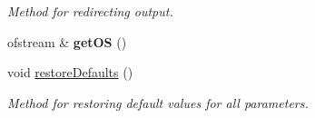 \begin{DoxyCompactItemize}
\begin{DoxyCompactList}\small\item\em Method for redirecting output. \end{DoxyCompactList}\item 
\hypertarget{classSGEnv_ad394d5d5216d7022227f73cd38ec0076}{ofstream \& {\bfseries get\-O\-S} ()}\label{classSGEnv_ad394d5d5216d7022227f73cd38ec0076}

\item 
\hypertarget{classSGEnv_a77e0bf7bafe7b9d6da890ccd6d1db624}{void \hyperlink{classSGEnv_a77e0bf7bafe7b9d6da890ccd6d1db624}{restore\-Defaults} ()}\label{classSGEnv_a77e0bf7bafe7b9d6da890ccd6d1db624}

\begin{DoxyCompactList}\small\item\em Method for restoring default values for all parameters. \end{DoxyCompactList}\end{DoxyCompactItemize}
